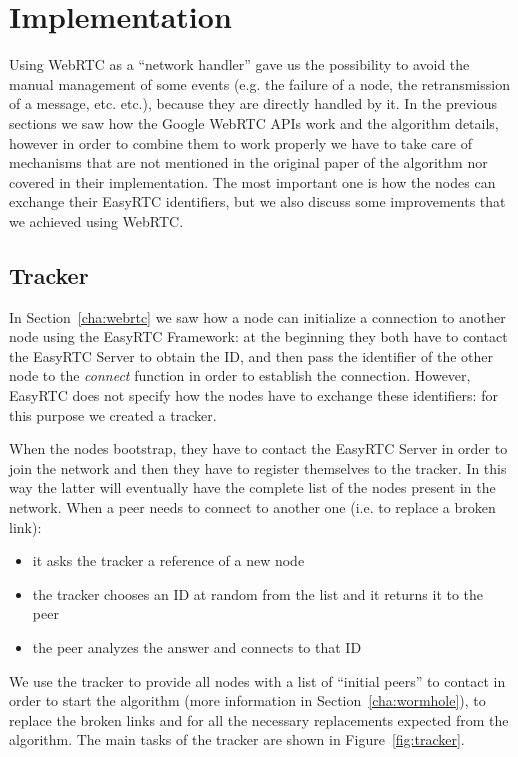 
\chapter{Implementation}
\label{cha:implementation}
Using WebRTC as a ``network handler'' gave us the possibility to avoid the manual management of some events (e.g. the failure of a node, the retransmission of a message, etc. etc.), because they are directly handled by it. In the previous sections we saw how the Google WebRTC APIs work and the algorithm details, however in order to combine them to work properly we have to take care of mechanisms that are not mentioned in the original paper of the algorithm nor covered in their implementation. The most important one is how the nodes can exchange their EasyRTC identifiers, but we also discuss some improvements that we achieved using WebRTC.

\section{Tracker}
\label{cha:tracker}
In Section~\ref{cha:webrtc} we saw how a node can initialize a connection to another node using the EasyRTC Framework: at the beginning they both have to contact the EasyRTC Server to obtain the ID, and then pass the identifier of the other node to the \textsf{\textit{connect}} function in order to establish the connection. However, EasyRTC does not specify how the nodes have to exchange these identifiers: for this purpose we created a tracker. 

When the nodes bootstrap, they have to contact the EasyRTC Server in order to join the network and then they have to register themselves to the tracker. In this way the latter will eventually have the complete list of the nodes present in the network. When a peer needs to connect to another one (i.e. to replace a broken link):
\begin{itemize}
	\item it asks the tracker a reference of a new node
	\item the tracker chooses an ID at random from the list and it returns it to the peer
	\item the peer analyzes the answer and connects to that ID
\end{itemize}

We use the tracker to provide all nodes with a list of ``initial peers'' to contact in order to start the algorithm (more information in Section~\ref{cha:wormhole}), to replace the broken links and for all the necessary replacements expected from the algorithm. The main tasks of the tracker are shown in Figure~\ref{fig:tracker}.

